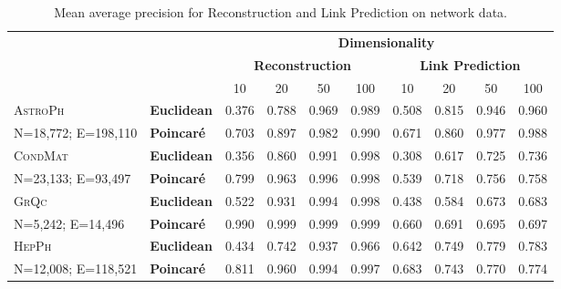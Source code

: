 \documentclass[11pt]{article}
\newcommand{\method}[1]{\textsc{#1}\xspace}
\begin{document}
\begin{table}
  \small
  \centering
  \caption{Mean average precision for Reconstruction and Link Prediction on network data.
    \label{tab:network}}
  \begin{tabular}{llcccccccc}
    \toprule
    & & \multicolumn{8}{c}{\textbf{Dimensionality}}\\
    \cmidrule(l){3-10}
    & & \multicolumn{4}{c}{\textbf{Reconstruction}} & \multicolumn{4}{c}{\textbf{Link Prediction}}\\
    \cmidrule(lr){3-6} \cmidrule(l){7-10}
    & & 10 & 20 & 50 & 100 & 10 & 20 & 50 & 100 \\
    \midrule
    \method{AstroPh} & \textbf{Euclidean} & 0.376 & 0.788 & 0.969 & 0.989 
       & 0.508 & 0.815 & 0.946 & 0.960\\
    {\tiny N=18,772; E=198,110}& \textbf{Poincaré} & 0.703 & 0.897 & 0.982 & 0.990 
       & 0.671 & 0.860 & 0.977 & 0.988 \\
    \midrule
    \method{CondMat} & \textbf{Euclidean} & 0.356 & 0.860 & 0.991 & 0.998 
       & 0.308 & 0.617 & 0.725 & 0.736 \\
    {\tiny N=23,133; E=93,497} & \textbf{Poincaré} & 0.799 & 0.963 & 0.996 & 0.998 
       & 0.539 & 0.718 & 0.756 & 0.758 \\
    \midrule
    \method{GrQc} & \textbf{Euclidean} & 0.522 & 0.931 & 0.994 & 0.998 
       & 0.438 & 0.584 & 0.673 & 0.683 \\
    {\tiny N=5,242; E=14,496}& \textbf{Poincaré} & 0.990 & 0.999 & 0.999 & 0.999 
       & 0.660 & 0.691 & 0.695 & 0.697 \\
    \midrule
    \method{HepPh} & \textbf{Euclidean} & 0.434 & 0.742 & 0.937 & 0.966 
       & 0.642 & 0.749 & 0.779 & 0.783 \\
    {\tiny N=12,008; E=118,521} & \textbf{Poincaré} & 0.811 & 0.960 & 0.994 & 0.997 
       & 0.683 & 0.743 & 0.770 & 0.774 \\
    \bottomrule
  \end{tabular}
\end{table}
\end{document}
